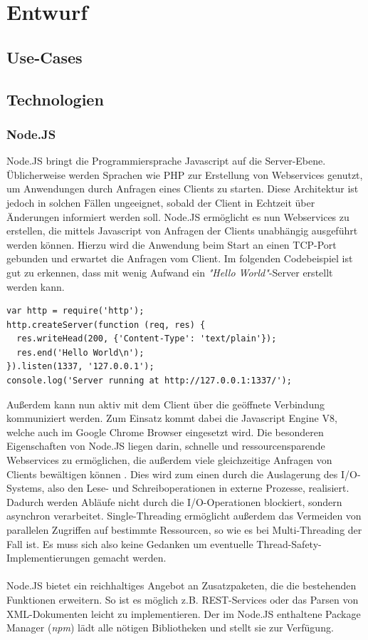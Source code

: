 \section{Entwurf}

\subsection{Use-Cases}

\subsection{Technologien}
\subsubsection{Node.JS}
Node.JS \cite{nodejswebsite} bringt die Programmiersprache Javascript auf die Server-Ebene. Üblicherweise werden Sprachen wie PHP zur Erstellung von Webservices genutzt, um Anwendungen durch Anfragen eines Clients zu starten. Diese Architektur ist jedoch in solchen Fällen ungeeignet, sobald der Client in Echtzeit über Änderungen informiert werden soll. Node.JS ermöglicht es nun Webservices zu erstellen, die mittels Javascript von Anfragen der Clients unabhängig ausgeführt werden können. Hierzu wird die Anwendung beim Start an einen TCP-Port gebunden und erwartet die Anfragen vom Client. Im folgenden Codebeispiel ist gut zu erkennen, dass mit wenig Aufwand ein \textit{"Hello World"}-Server erstellt werden kann.

\begin{lstlisting}
var http = require('http');
http.createServer(function (req, res) {
  res.writeHead(200, {'Content-Type': 'text/plain'});
  res.end('Hello World\n');
}).listen(1337, '127.0.0.1');
console.log('Server running at http://127.0.0.1:1337/');
\end{lstlisting}

Außerdem kann nun aktiv mit dem Client über die geöffnete Verbindung kommuniziert werden. Zum Einsatz kommt dabei die Javascript Engine V8, welche auch im Google Chrome Browser eingesetzt wird. Die besonderen Eigenschaften von Node.JS liegen darin, schnelle und ressourcensparende Webservices zu ermöglichen, die außerdem viele gleichzeitige Anfragen von Clients bewältigen können \cite{cantelon:nodejs}. Dies wird zum einen durch die Auslagerung des I/O-Systems, also den Lese- und Schreiboperationen in externe Prozesse, realisiert. Dadurch werden Abläufe nicht durch die I/O-Operationen blockiert, sondern asynchron verarbeitet. Single-Threading ermöglicht außerdem das Vermeiden von parallelen Zugriffen auf bestimmte Ressourcen, so wie es bei Multi-Threading der Fall ist. Es muss sich also keine Gedanken um eventuelle Thread-Safety-Implementierungen gemacht werden.
\\
\\
Node.JS bietet ein reichhaltiges Angebot an Zusatzpaketen, die die bestehenden Funktionen erweitern. So ist es möglich z.B. REST-Services oder das Parsen von XML-Dokumenten leicht zu implementieren. Der im Node.JS enthaltene Package Manager (\textit{npm}) lädt alle nötigen Bibliotheken und stellt sie zur Verfügung.

